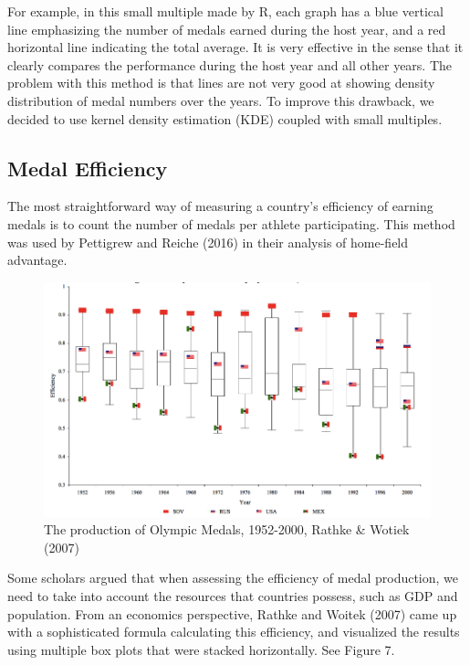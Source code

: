 \documentclass[12pt]{article}
\begin{document}
For example, in this small multiple made by R, each graph has a blue vertical line emphasizing the number of medals earned during the host year, and a red horizontal line indicating the total average. It is very effective in the sense that it clearly compares the performance during the host year and all other years. The problem with this method is that lines are not very good at showing density distribution of medal numbers over the years. To improve this drawback, we decided to use kernel density estimation (KDE) coupled with small multiples. 

\subsection{Medal Efficiency}
The most straightforward way of measuring a country’s efficiency of earning medals is to count the number of medals per athlete participating. This method was used by Pettigrew and Reiche (2016) in their analysis of home-field advantage. 
\begin{figure}[!b]
    \centering
    \includegraphics[trim={0 0 0 0.2cm},clip,scale=0.35]{pics/3-2.png}
    \caption{The production of Olympic Medals, 1952-2000, Rathke \& Wotiek (2007)}
    \label{fig:my_label}
\end{figure}

Some scholars argued that when assessing the efficiency of medal production, we need to take into account the resources that countries possess, such as GDP and population. From an economics perspective, Rathke and Woitek (2007) came up with a sophisticated formula calculating this efficiency, and visualized the results using multiple box plots that were stacked horizontally. See Figure 7.
\end{document}
